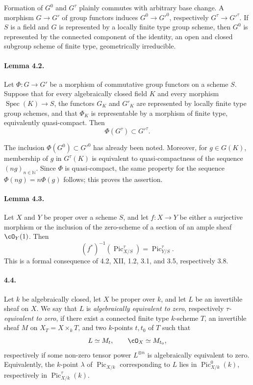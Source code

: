 \documentclass[11pt]{article}
\theoremstyle{plain}
\theoremstyle{definition}
\theoremstyle{remark}
\newcommand{\NN}{\mathbb N}
\DeclareMathOperator{\Spec}{Spec}
\DeclareMathOperator{\Pic}{Pic}
\begin{document}
Formation of $G^0$ and $G^\tau$ plainly commutes with arbitrary base change. A morphism $G\to G'$ of group functors induces $G^0\to G'^0$, respectively $G^\tau\to G'^\tau$. If $S$ is a field and $G$ is represented by a locally finite type group scheme, then $G^0$ is represented by the connected component of the identity, an open and closed subgroup scheme of finite type, geometrically irreducible.

\paragraph{Lemma 4.2.}
Let $\Phi:G\to G'$ be a morphism of commutative group functors on a scheme $S$. Suppose that for every algebraically closed field $K$ and every morphism $\Spec(K)\to S$, the functors $G_K$ and $G'_K$ are represented by locally finite type group schemes, and that $\Phi_K$ is representable by a morphism of finite type, equivalently quasi-compact. Then
\[
\Phi(G^\tau)\subset G'^\tau.
\]

The inclusion $\Phi(G^0)\subset G'^0$ has already been noted. Moreover, for $g\in G(K)$, membership of $g$ in $G^\tau(K)$ is equivalent to quasi-compactness of the sequence $(ng)_{n\in\NN}$. Since $\Phi$ is quasi-compact, the same property for the sequence $\Phi(ng)=n\Phi(g)$ follows; this proves the assertion.

\paragraph{Lemma 4.3.}
Let $X$ and $Y$ be proper over a scheme $S$, and let $f:X\to Y$ be either a surjective morphism or the inclusion of the zero-scheme of a section of an ample sheaf $\cO_Y(1)$. Then
\[
(f^*)^{-1}(\Pic^\tau_{X/S})=\Pic^\tau_{Y/S}.
\]
This is a formal consequence of 4.2, XII, 1.2, 3.1, and 3.5, respectively 3.8.

\paragraph{4.4.}
Let $k$ be algebraically closed, let $X$ be proper over $k$, and let $L$ be an invertible sheaf on $X$. We say that $L$ is \emph{algebraically equivalent to zero}, respectively \emph{$\tau$-equivalent to zero}, if there exist a connected finite type $k$-scheme $T$, an invertible sheaf $M$ on $X_T=X\times_kT$, and two $k$-points $t,t_0$ of $T$ such that
\[
L\simeq M_t,\qquad \cO_X\simeq M_{t_0},
\]
respectively if some non-zero tensor power $L^{\otimes n}$ is algebraically equivalent to zero. Equivalently, the $k$-point $\lambda$ of $\Pic_{X/k}$ corresponding to $L$ lies in $\Pic^0_{X/k}(k)$, respectively in $\Pic^\tau_{X/k}(k)$.
\end{document}
